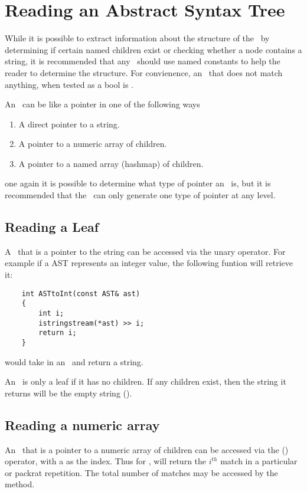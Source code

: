 \section{Reading an Abstract Syntax Tree}
While it is possible to extract information about the structure of the \AST\ 
    by determining if certain named children exist or checking whether a node contains a string,
    it is recommended that any \grammar\ should use named constants to help the reader to determine the structure.
    For convienence, an \AST\ that does not match anything, when tested as a bool is \code{false}.

An \AST\ can be like a pointer in one of the following ways
    \begin{enumerate}
        \item A direct pointer to a string.
        \item A pointer to a numeric array of children.
        \item A pointer to a named array (hashmap) of children.
    \end{enumerate}
    one again it is possible to determine what type of pointer an \AST\ is,
    but it is recommended that the \grammar\ can only generate one type of pointer at any level.

\subsection{Reading a Leaf}
A \AST\ that is a pointer to the string can be accessed via the unary \code{*} operator.
    For example if a AST represents an integer value, the following funtion will retrieve it:
    \begin{verbatim}
    int ASTtoInt(const AST& ast)
    {
        int i;
        istringstream(*ast) >> i;
        return i;
    }
    \end{verbatim}
    would take in an \AST\ and return a string.

An \AST\ is only a leaf if it has no children.
    If any children exist, then the string it returns will be the empty string ().

\subsection{Reading a numeric array}
An \AST\ that is a pointer to a numeric array of children can be accessed via the (\code{[]}) operator,
    with a \code{size\_t} as the index.
    Thus for ,  will return the $i^{th}$ match in a particular \code{*} or \code{+} packrat repetition.
    The total number of matches may be accessed by the \code{length()} method.

